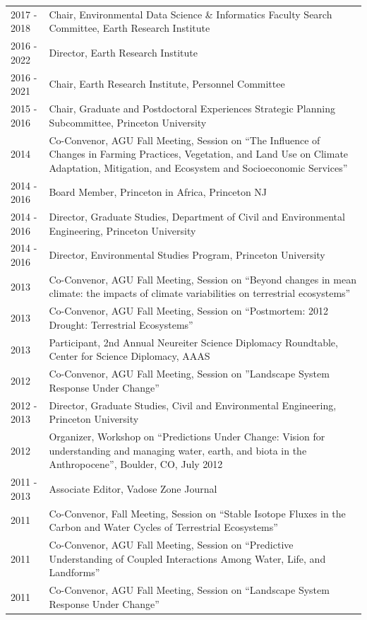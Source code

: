 \begin{longtable}{l p{5.5in}}
2017 - 2018 & Chair, Environmental Data Science \& Informatics Faculty Search Committee, Earth Research Institute \\
2016 - 2022 & Director, Earth Research Institute \\
2016 - 2021 & Chair, Earth Research Institute, Personnel Committee \\
2015 - 2016 & Chair, Graduate and Postdoctoral Experiences Strategic Planning Subcommittee, Princeton University \\
2014 & Co-Convenor, AGU Fall Meeting, Session on ``The Influence of Changes in Farming Practices, Vegetation, and Land Use on Climate Adaptation, Mitigation, and Ecosystem and Socioeconomic Services'' \\
2014 - 2016 & Board Member, Princeton in Africa, Princeton NJ \\
2014 - 2016 & Director, Graduate Studies, Department of Civil and Environmental Engineering, Princeton University \\
2014 - 2016 & Director, Environmental Studies Program, Princeton University \\
2013 & Co-Convenor, AGU Fall Meeting, Session on ``Beyond changes in mean climate: the impacts of climate variabilities on terrestrial ecosystems'' \\
2013 & Co-Convenor, AGU Fall Meeting, Session on ``Postmortem: 2012 Drought: Terrestrial Ecosystems'' \\
2013 & Participant, 2nd Annual Neureiter Science Diplomacy Roundtable, Center for Science Diplomacy, AAAS \\
2012 & Co-Convenor, AGU Fall Meeting, Session on ''Landscape System Response Under Change'' \\
2012 - 2013 & Director, Graduate Studies, Civil and Environmental Engineering, Princeton University \\
2012 & Organizer, Workshop on ``Predictions Under Change: Vision for understanding and managing water, earth, and biota in the Anthropocene'', Boulder, CO, July 2012 \\
2011 - 2013 & Associate Editor, Vadose Zone Journal \\
2011 & Co-Convenor, Fall Meeting, Session on ``Stable Isotope Fluxes in the Carbon and Water Cycles of Terrestrial Ecosystems'' \\
2011 & Co-Convenor, AGU Fall Meeting, Session on ``Predictive Understanding of Coupled Interactions Among Water, Life, and Landforms'' \\
2011 & Co-Convenor, AGU Fall Meeting, Session on ``Landscape System Response Under Change'' \\

\end{longtable}
